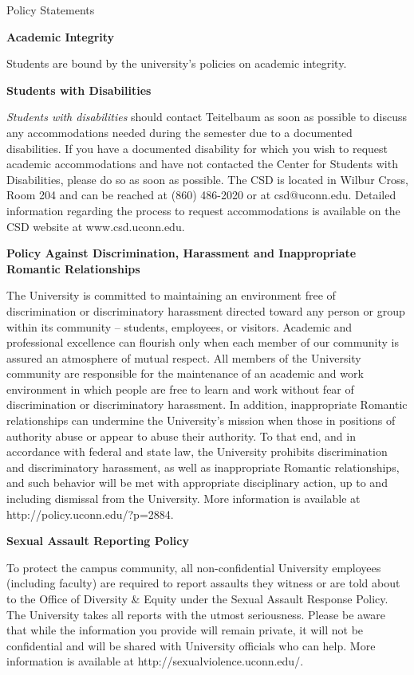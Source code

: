 \documentclass[12pt]{article}
\begin{document}
 

\begin{center}

{\Large Policy Statements}

\end{center}

{\bf Academic Integrity} 

Students are bound by the university's policies on academic integrity.

{\bf Students with Disabilities}

{\it Students with disabilities} should contact Teitelbaum as soon as
possible to discuss any accommodations needed during the semester due
to a documented disabilities.  If you have a documented disability for
which you wish to request academic accommodations and have not
contacted the Center for Students with Disabilities, please do so as
soon as possible.  The CSD is located in Wilbur Cross, Room 204 and
can be reached at (860) 486-2020 or at csd@uconn.edu.  Detailed
information regarding the process to request accommodations is
available on the CSD website at www.csd.uconn.edu.

{\bf Policy Against Discrimination, Harassment and Inappropriate
Romantic Relationships}

The University is committed to maintaining an environment free of
discrimination or discriminatory harassment directed toward any person
or group within its community – students, employees, or visitors.
Academic and professional excellence can flourish only when each
member of our community is assured an atmosphere of mutual respect.
All members of the University community are responsible for the
maintenance of an academic and work environment in which people are
free to learn and work without fear of discrimination or
discriminatory harassment.  In addition, inappropriate Romantic
relationships can undermine the University’s mission when those in
positions of authority abuse or appear to abuse their authority.  To
that end, and in accordance with federal and state law, the University
prohibits discrimination and discriminatory harassment, as well as
inappropriate Romantic relationships, and such behavior will be met
with appropriate disciplinary action, up to and including dismissal
from the University.  More information is available at
http://policy.uconn.edu/?p=2884.

{\bf Sexual Assault Reporting Policy}

To protect the campus community, all non-confidential University
employees (including faculty) are required to report assaults they
witness or are told about to the Office of Diversity \& Equity under
the Sexual Assault Response Policy.  The University takes all reports
with the utmost seriousness.  Please be aware that while the
information you provide will remain private, it will not be
confidential and will be shared with University officials who can
help.  More information is available at
http://sexualviolence.uconn.edu/.
\end{document}
